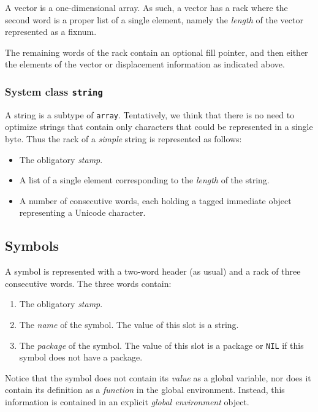 A vector is a one-dimensional array.  As such, a vector has a rack
where the second word is a proper list of a single element,
namely the \emph{length} of the vector represented as a fixnum.

The remaining words of the rack contain an optional fill
pointer, and then either the elements of the vector or displacement
information as indicated above.

\subsubsection{System class \texttt{string}}

A string is a subtype of \texttt{array}.  Tentatively, we think that
there is no need to optimize strings that contain only characters that
could be represented in a single byte.  Thus the rack of a
\emph{simple} string is represented as follows:

\begin{itemize}
\item The obligatory \emph{stamp}.
\item A list of a single element corresponding to the \emph{length} of
  the string.
\item A number of consecutive words, each holding a tagged immediate
  object representing a Unicode character.
\end{itemize}

\subsection{Symbols}

A symbol is represented with a two-word header (as usual) and a
rack of three consecutive words.  The three words contain:

\begin{enumerate}
\item The obligatory \emph{stamp}.
\item The \emph{name} of the symbol.  The value of this slot is a
  string.
\item The \emph{package} of the symbol.  The value of this slot is a
  package or \texttt{NIL} if this symbol does not have a package.
\end{enumerate}

Notice that the symbol does not contain its \emph{value} as a global
variable, nor does it contain its definition as a \emph{function} in
the global environment.  Instead, this information is contained in an
explicit \emph{global environment} object.

